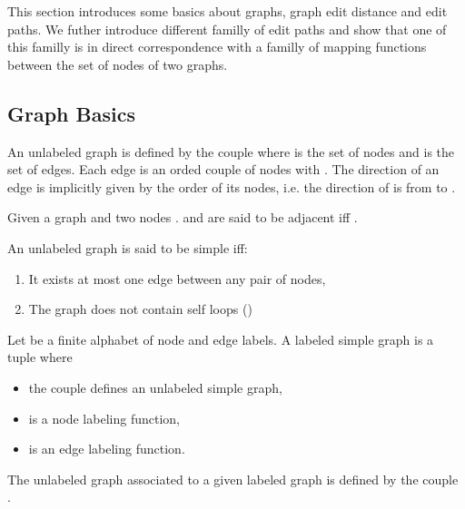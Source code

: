 This section introduces some basics about graphs, graph edit distance
and edit paths. We futher introduce different familly of edit paths
and show that one of this familly is in direct correspondence with a
familly of mapping functions between the set of nodes of two graphs.
\subsection{Graph Basics}\label{sec:mainDef}
\begin{definition}
  An unlabeled  graph  is defined by the couple
   where  is the set of nodes and  is the set of edges. Each edge is an orded couple
  of nodes  with . The direction of an edge is
  implicitly given by the order of its nodes, 
  i.e. the direction of  is from  to .
\end{definition}
\begin{definition}
Given a graph  and two nodes .  and  are
  said to be adjacent iff .
\end{definition}
\begin{definition}
  An unlabeled graph is said to be simple iff:
  \begin{enumerate}
  \item It exists at most one edge between any pair of nodes,
  \item The graph does not contain self loops
    ()
  \end{enumerate}
\end{definition}
\begin{definition}\label{def:labeledsimplegraph}
  Let  be a finite alphabet of node and edge labels. A
  labeled simple graph  is a tuple  where 
  \begin{itemize}
  \item the couple  defines an unlabeled simple graph,
  \item  is a node labeling function,
  \item  is an edge labeling function.
  \end{itemize}
  The unlabeled graph associated to a given labeled graph
   is defined by the couple .
\end{definition}


